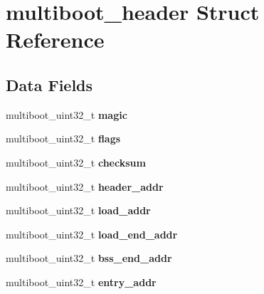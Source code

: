 \hypertarget{structmultiboot__header}{
\section{multiboot\_\-header Struct Reference}
\label{structmultiboot__header}
}
\subsection*{Data Fields}
\begin{DoxyCompactItemize}
\item 
\hypertarget{structmultiboot__header_a7fddee92e60ff58e159c6bf2c40bf29b}{
multiboot\_\-uint32\_\-t {\bfseries magic}}
\label{structmultiboot__header_a7fddee92e60ff58e159c6bf2c40bf29b}

\item 
\hypertarget{structmultiboot__header_ab922f32c179ec7bde91519d19f27d95b}{
multiboot\_\-uint32\_\-t {\bfseries flags}}
\label{structmultiboot__header_ab922f32c179ec7bde91519d19f27d95b}

\item 
\hypertarget{structmultiboot__header_a17e73abddfe8264c254767a20099038d}{
multiboot\_\-uint32\_\-t {\bfseries checksum}}
\label{structmultiboot__header_a17e73abddfe8264c254767a20099038d}

\item 
\hypertarget{structmultiboot__header_a9718b2fc6ce29a37e9a209f92ab856e3}{
multiboot\_\-uint32\_\-t {\bfseries header\_\-addr}}
\label{structmultiboot__header_a9718b2fc6ce29a37e9a209f92ab856e3}

\item 
\hypertarget{structmultiboot__header_a99de1cf326c46c76c6039f317b7a1ef2}{
multiboot\_\-uint32\_\-t {\bfseries load\_\-addr}}
\label{structmultiboot__header_a99de1cf326c46c76c6039f317b7a1ef2}

\item 
\hypertarget{structmultiboot__header_ac9efc1a4c3cd18f286b2fd50ff052e31}{
multiboot\_\-uint32\_\-t {\bfseries load\_\-end\_\-addr}}
\label{structmultiboot__header_ac9efc1a4c3cd18f286b2fd50ff052e31}

\item 
\hypertarget{structmultiboot__header_ab4f2496ec9b0d1a95985929d281dfa19}{
multiboot\_\-uint32\_\-t {\bfseries bss\_\-end\_\-addr}}
\label{structmultiboot__header_ab4f2496ec9b0d1a95985929d281dfa19}

\item 
\hypertarget{structmultiboot__header_ac3d807775a9d69730e6698dcdcf6491e}{
multiboot\_\-uint32\_\-t {\bfseries entry\_\-addr}}
\label{structmultiboot__header_ac3d807775a9d69730e6698dcdcf6491e}


\end{DoxyCompactItemize}
